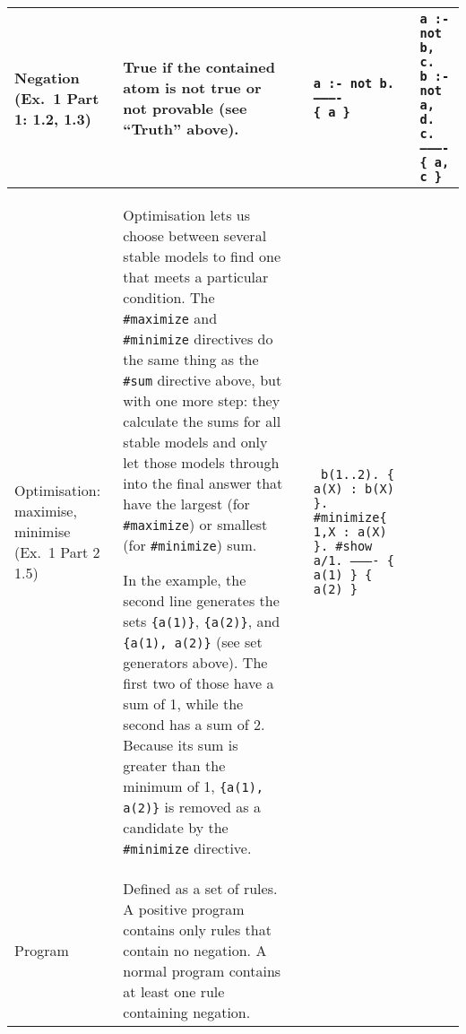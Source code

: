 \documentclass[9pt,a4paper,landscape]{article}
\begin{document}
{\begin{longtable}{Lp{14.5cm}lXX}
Negation \newline (Ex.\ 1 Part 1: 1.2, 1.3)
& True if the contained atom is not true or not provable (see ``Truth'' above).
&& \texttt{a :- not b. \newline
	---------- \newline
	\{ a \} } 
& \texttt{a :- not b, c. \newline
	b :- not a, d. \newline
	c. \newline
	---------- \newline
	\{ a, c \}} \\ \midrule


Optimisation: maximise, minimise \newline (Ex.\ 1 Part 2 1.5)
& Optimisation lets us choose between several stable models to find one that meets a particular condition. The \texttt{\#maximize} and \texttt{\#minimize} directives do the same thing as the \texttt{\#sum} directive above, but with one more step: they calculate the sums for all stable models and only let those models through into the final answer that have the largest (for \texttt{\#maximize}) or smallest (for \texttt{\#minimize}) sum. \newline

In the example, the second line generates the sets \texttt{\{a(1)\}}, \texttt{\{a(2)\}}, and \texttt{\{a(1), a(2)\}} (see set generators above).
The first two of those have a sum of 1, while the second has a sum of 2.
Because its sum is greater than the minimum of 1, \texttt{\{a(1), a(2)\}} is removed as a candidate by the \texttt{\#minimize} directive.

&& {\footnotesize\texttt{%
		b(1..2). \{ a(X) : b(X) \}.\newline
		\#minimize\{ 1,X : a(X) \}.\newline
		\#show a/1.\newline
		---------- \newline
		\{ a(1) \} \newline
		\{ a(2) \} \newline
}} &\\  \midrule







Program
& Defined as a set of rules. A positive program contains only rules that contain no negation. A normal program contains at least one rule containing negation. &&&\\ \midrule


\end{longtable}}
\end{document}
